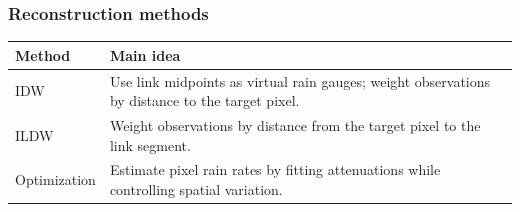 \documentclass[aspectratio=169]{beamer}
\newcommand{\slidetitle}[1]{\frametitle{#1}}
\newcommand{\methodrow}[2]{#1 & #2\\}
\newcommand{\methodstable}[1]{%
  \begingroup
  \renewcommand{\arraystretch}{2.0}%
  \begin{tabular}{p{0.34\textwidth}p{0.59\textwidth}}
  \textbf{Method} & \textbf{Main idea}\\\hline
  #1
  \end{tabular}
  \endgroup}
\begin{document}

\begin{frame}[t]
\slidetitle{Reconstruction methods}
\vspace{8mm}
\centering
\methodstable{
  \methodrow{IDW}{Use link midpoints as virtual rain gauges; weight observations by distance to the target pixel.}
  \methodrow{ILDW}{Weight observations by distance from the target pixel to the link segment.}
  \methodrow{Optimization}{Estimate pixel rain rates by fitting attenuations while controlling spatial variation.}}
\end{frame}
\end{document}
